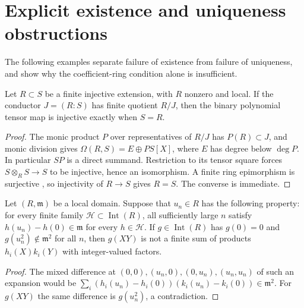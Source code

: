 \section{Explicit existence and uniqueness obstructions}
The following examples separate failure of existence from failure of
uniqueness, and show why the coefficient-ring condition alone is insufficient.

\begin{lemma}\label{lem:finite-conductor-coefficient-obstruction}
Let $R\subset S$ be a finite injective extension, with $R$ nonzero
and local. If the conductor $J=(R:S)$ has finite quotient $R/J$,
then the binary polynomial tensor map is injective exactly when
$S=R$.
\end{lemma}
\begin{proof}
The monic product $P$ over representatives of $R/J$ has
$P(R)\subset J$, and monic division gives
$\Omega(R,S)=E\oplus PS[X]$, where $E$ has degree below $\deg P$.
In particular $SP$ is a direct summand. Restriction to its tensor
square forces $S\otimes_RS\to S$ to be injective, hence an
isomorphism. A finite ring epimorphism is surjective
\cite[Lemma~10.107.6]{StacksRingEpimorphisms}, so injectivity of
$R\to S$ gives $R=S$. The converse is immediate.
\end{proof}

\begin{lemma}\label{lem:binary-mixed-difference-obstruction}
Let $(R,\mathfrak m)$ be a local domain. Suppose that $u_n\in R$
has the following property: for every finite family
$\mathcal H\subset\operatorname{Int}(R)$, all sufficiently large
$n$ satisfy $h(u_n)-h(0)\in\mathfrak m$ for every $h\in\mathcal H$.
If $g\in\operatorname{Int}(R)$ has $g(0)=0$ and
$g(u_n^2)\notin\mathfrak m^2$ for all $n$, then $g(XY)$ is not a
finite sum of products $h_i(X)k_i(Y)$ with integer-valued factors.
\end{lemma}
\begin{proof}
The mixed difference at $(0,0),(u_n,0),(0,u_n),(u_n,u_n)$ of such
an expansion would be
$\sum_i(h_i(u_n)-h_i(0))(k_i(u_n)-k_i(0))\in\mathfrak m^2$.
For $g(XY)$ the same difference is $g(u_n^2)$, a contradiction.
\end{proof}

